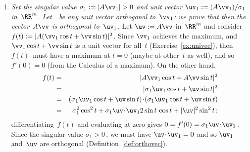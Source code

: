 \begin{enumerate}
\item \emph{Set the singular value \(\sigma_1:=|A\vv_1|>0\) and unit vector \(\uv_1:=(A\vv_1)/\sigma_1\) in~\(\RR^m\). 
Let~\vv\ be any unit vector orthogonal to~\(\vv_1\): we prove that then the vector~\(A\vv\) is orthogonal to~\(\uv_1\).}
Let \(\uv:=A\vv\) in~\(\RR^m\) and consider \(f(t):=|A(\vv_1\cos t+\vv\sin t)|^2\).
Since \(\vv_1\) achieves the maximum, and \(\vv_1\cos t+\vv\sin t\) is a unit vector for all~\(t\) (Exercise~\ref{ex:univec}), then \(f(t)\)~must have a maximum at \(t=0\) (maybe at other~\(t\) as well), and so \(f'(0)=0\) (from the Calculus of a maximum).
On the other hand, 
\begin{eqnarray*}
f(t)&=&|A\vv_1\cos t+A\vv\sin t|^2
\\&=&|\sigma_1\uv_1\cos t+\uv\sin t|^2
\\&=&(\sigma_1\uv_1\cos t+\uv\sin t)\cdot(\sigma_1\uv_1\cos t+\uv\sin t)
\\&=&\sigma_1^2\cos^2 t+\sigma_1\uv\cdot\uv_12\sin t\,\cos t+|\uv|^2\sin^2 t
\,;
\end{eqnarray*}
differentiating~\(f(t)\) and evaluating at zero gives
\(0=f'(0)=\sigma_1\uv\cdot\uv_1\)\,.
Since the singular value \(\sigma_1>0\)\,, we must have \(\uv\cdot\uv_1=0\) and so \(\uv_1\) and~\(\uv\) are orthogonal (Definition~\ref{def:orthovec}).


\end{enumerate}
